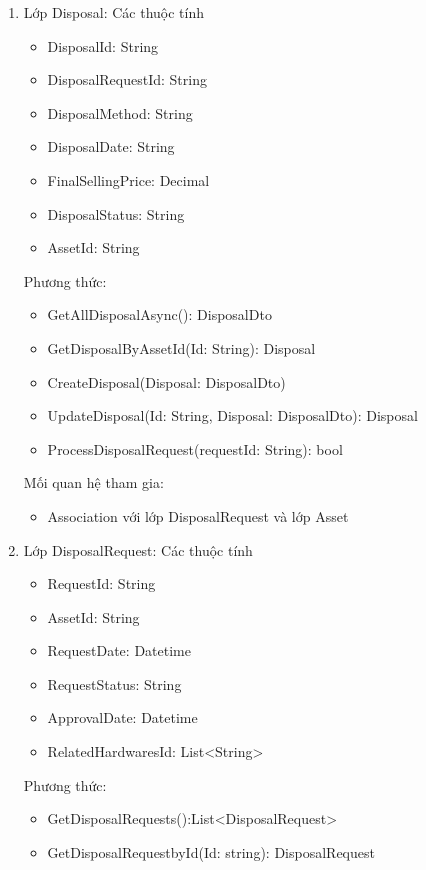 \begin{enumerate}
    \item Lớp Disposal:
    Các thuộc tính
    \begin{itemize}[label=--]
        \item DisposalId: String
        \item DisposalRequestId: String
        \item DisposalMethod: String
        \item DisposalDate: String
        \item FinalSellingPrice: Decimal
        \item DisposalStatus: String
        \item AssetId: String
    \end{itemize}
    Phương thức:
    \begin{itemize}[label=--]
        \item GetAllDisposalAsync(): DisposalDto
        \item GetDisposalByAssetId(Id: String): Disposal
        \item CreateDisposal(Disposal: DisposalDto)
        \item UpdateDisposal(Id: String, Disposal: DisposalDto): Disposal
        \item ProcessDisposalRequest(requestId: String): bool
    \end{itemize}
    Mối quan hệ tham gia:
    \begin{itemize}[label=--]
        \item Association với lớp DisposalRequest và lớp Asset
    \end{itemize}
    \item Lớp DisposalRequest:
    Các thuộc tính
    \begin{itemize}[label=--]
        \item RequestId: String
        \item AssetId: String
        \item RequestDate: Datetime
        \item RequestStatus: String
        \item ApprovalDate: Datetime
        \item RelatedHardwaresId: List<String>
    \end{itemize}
    Phương thức:
    \begin{itemize}[label=--]
        \item GetDisposalRequests():List<DisposalRequest>
        \item GetDisposalRequestbyId(Id: string): DisposalRequest

\end{itemize}
\end{enumerate}
